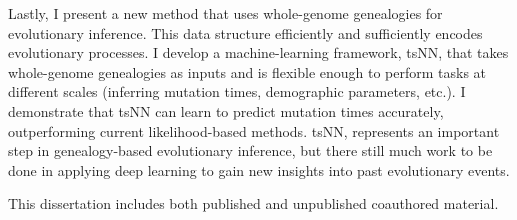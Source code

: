 {Lastly, I present a new method that uses whole-genome genealogies for evolutionary inference.
This data structure efficiently and sufficiently encodes evolutionary processes.
I develop a machine-learning framework, tsNN, that takes whole-genome genealogies as inputs
and is flexible enough to perform tasks at different scales (\eg inferring mutation times, demographic parameters, etc.).
I demonstrate that tsNN can learn to predict mutation times accurately, outperforming current likelihood-based methods.
tsNN, represents an important step in genealogy-based evolutionary inference, 
but there still much work to be done in applying deep learning to gain new insights into past evolutionary events.

This dissertation includes both published and unpublished coauthored material.
}
